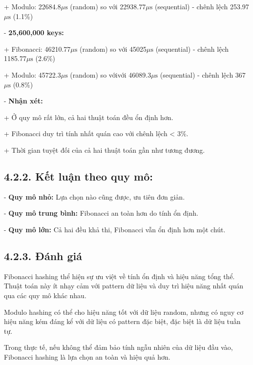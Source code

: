 \documentclass[12pt,a4paper]{report}
\begin{document}
        \hspace{1cm}+ Modulo: 22684.8$\mu\text{s}$ (random) so với 22938.77$\mu\text{s}$ (sequential) - chênh lệch 253.97$\mu\text{s}$ (1.1\%)
        
    - \textbf{25,600,000 keys:}

       \hspace{1cm}+ Fibonacci: 46210.77$\mu\text{s}$ (random) so với 45025$\mu\text{s}$ (sequential) - chênh lệch 1185.77$\mu\text{s}$ (2.6\%)
        
       \hspace{1cm}+ Modulo: 45722.3$\mu\text{s}$ (random) so vớivới 46089.3$\mu\text{s}$ (sequential) - chênh lệch 367$\mu\text{s}$ (0.8\%)

- \textbf{Nhận xét:}

    \hspace{1cm}+ Ở quy mô rất lớn, cả hai thuật toán đều ổn định hơn.
    
   \hspace{1cm}+ Fibonacci duy trì tính nhất quán cao với chênh lệch < 3\%.
    
   \hspace{1cm}+ Thời gian tuyệt đối của cả hai thuật toán gần như tương đương.

\subsection*{4.2.2. Kết luận theo quy mô:}
     \noindent \indent- \textbf{Quy mô nhỏ:} Lựa chọn nào cũng được, ưu tiên đơn giản.
     
     - \textbf{Quy mô trung bình:} Fibonacci an toàn hơn do tính ổn định.
     
     - \textbf{Quy mô lớn:} Cả hai đều khả thi, Fibonacci vẫn ổn định hơn một chút.

\subsection*{4.2.3. Đánh giá}

\noindent \indent Fibonacci hashing thể hiện sự ưu việt về tính ổn định và hiệu năng tổng thể. Thuật toán này ít nhạy cảm với pattern dữ liệu và duy trì hiệu năng nhất quán qua các quy mô khác nhau.

Modulo hashing có thể cho hiệu năng tốt với dữ liệu random, nhưng có nguy cơ hiệu năng kém đáng kể với dữ liệu có pattern đặc biệt, đặc biệt là dữ liệu tuần tự.

Trong thực tế, nếu không thể đảm bảo tính ngẫu nhiên của dữ liệu đầu vào, Fibonacci hashing là lựa chọn an toàn và hiệu quả hơn.
\end{document}
